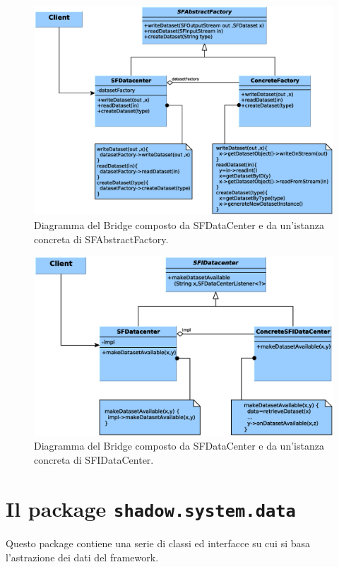 \begin{figure}
\begin{center}
\includegraphics[width=\textwidth]{Immagini/DataCenterfactory}
\caption[Bridge composto da SFDataCenter e SFAbstractFactory]{Diagramma del Bridge composto da SFDataCenter e da un'istanza concreta di SFAbstractFactory.\label{f:datacenterfactory}} 
\end{center} 
\end{figure}
\begin{figure}
\begin{center}
\includegraphics[width=\textwidth]{Immagini/DataCenter}
\caption[Bridge composto da SFDataCenter e SFIDataCenter]{Diagramma del Bridge composto da SFDataCenter e da un'istanza concreta di SFIDataCenter.\label{f:datacenterimplementation}} 
\end{center} 
\end{figure}

\section{Il package \texttt{shadow.system.data}}
\label{sec:shadow_system_data}
Questo package contiene una serie di classi ed interfacce su cui si basa l'astrazione dei dati del framework.

